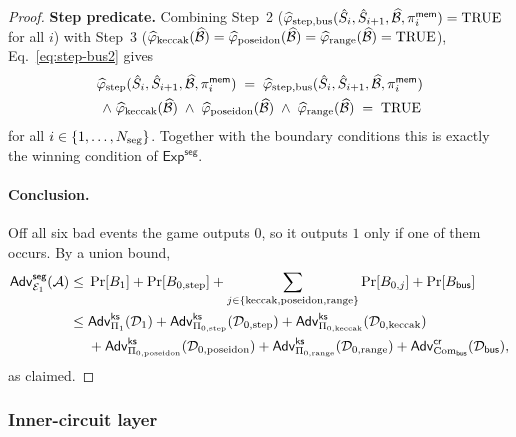 \begin{proof}
\textbf{Step predicate.} Combining Step~2
($\widehat{\varphi}_{\mathrm{step},\mathrm{bus}}(\hat{S}_i,\hat{S}_{i+1},\widehat{\mathcal{B}},\pi^{\mathsf{mem}}_i)=\mathrm{TRUE}$
for all $i$) with Step~3
($\widehat{\varphi}_{\mathrm{keccak}}(\widehat{\mathcal{B}})=\widehat{\varphi}_{\mathrm{poseidon}}(\widehat{\mathcal{B}})=\widehat{\varphi}_{\mathrm{range}}(\widehat{\mathcal{B}})=\mathrm{TRUE}$),
Eq.~\eqref{eq:step-bus2} gives
\begin{multline*}
  \widehat{\varphi}_{\mathrm{step}}(\hat{S}_i,\hat{S}_{i+1},\widehat{\mathcal{B}},\pi^{\mathsf{mem}}_i)
  \;=\;
  \widehat{\varphi}_{\mathrm{step},\mathrm{bus}}(\hat{S}_i,\hat{S}_{i+1},\widehat{\mathcal{B}},\pi^{\mathsf{mem}}_i)\\
  \;\wedge\;
  \widehat{\varphi}_{\mathrm{keccak}}(\widehat{\mathcal{B}})
  \;\wedge\;
  \widehat{\varphi}_{\mathrm{poseidon}}(\widehat{\mathcal{B}})
  \;\wedge\;
  \widehat{\varphi}_{\mathrm{range}}(\widehat{\mathcal{B}})
  \;=\;\mathrm{TRUE}
\end{multline*}
for all $i\in\{1,\ldots,N_{\mathrm{seg}}\}$. Together with the boundary conditions this
is exactly the winning condition of $\mathsf{Exp}^{\mathsf{seg}}$.

\paragraph{Conclusion.}
Off all six bad events the game outputs $0$, so it outputs $1$ only if one of
them occurs. By a union bound,
\begin{align*}
  \mathsf{Adv}^{\mathsf{seg}}_{\mathcal{E}_1}(\mathcal{A})
  \le{}& \Pr[B_1]+\Pr[B_{0,\mathrm{step}}]+\sum_{j\in\{\mathrm{keccak},\mathrm{poseidon},\mathrm{range}\}}\Pr[B_{0,j}]+\Pr[B_{\mathsf{bus}}]\\
  \le{}& \mathsf{Adv}^{\mathsf{ks}}_{\Pi_1}(\mathcal{D}_1)
  + \mathsf{Adv}^{\mathsf{ks}}_{\Pi_{0,\mathrm{step}}}(\mathcal{D}_{0,\mathrm{step}})
  + \mathsf{Adv}^{\mathsf{ks}}_{\Pi_{0,\mathrm{keccak}}}(\mathcal{D}_{0,\mathrm{keccak}})\\
  &+ \mathsf{Adv}^{\mathsf{ks}}_{\Pi_{0,\mathrm{poseidon}}}(\mathcal{D}_{0,\mathrm{poseidon}})
  + \mathsf{Adv}^{\mathsf{ks}}_{\Pi_{0,\mathrm{range}}}(\mathcal{D}_{0,\mathrm{range}})
  + \mathsf{Adv}^{\mathsf{cr}}_{\mathrm{Com}_{\mathsf{bus}}}(\mathcal{D}_{\mathsf{bus}}),
\end{align*}
as claimed.
\end{proof}

\subsubsection{Inner-circuit layer}\label{sec:lem:inner}

